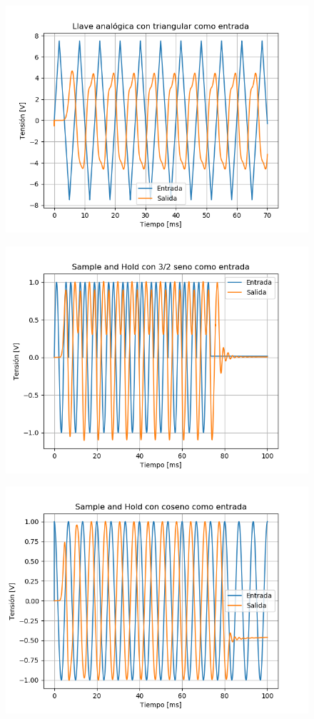 \begin{multicols}{2}
\begin{figure}[H]
	\includegraphics[width=\linewidth]{ImagenesEjercicio6/LA - Tri.png}
\end{figure}
\begin{figure}[H]
	\centering
	\includegraphics[width=\linewidth]{ImagenesEjercicio6/SH - 3 2.png}
\end{figure}
\begin{figure}[H]
	\centering
	\includegraphics[width=\linewidth]{ImagenesEjercicio6/SH - Cos.png}

\end{figure}
\end{multicols}

